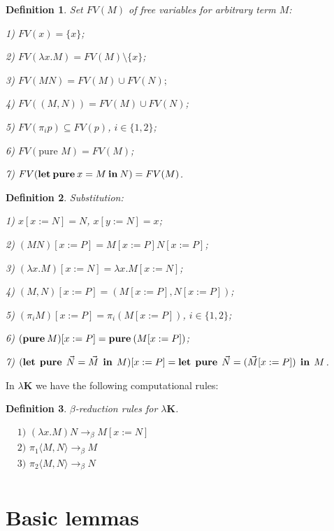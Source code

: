 \documentclass[a4paper]{article}
\newtheorem{defin}{Definition}
\begin{document}
  \begin{defin} Set $FV(M)$ of free variables for arbitrary term $M$:

  1) $FV(x) = \{ x \}$;

  2) $FV(\lambda x. M) = FV(M) \setminus \{ x\}$;

  3) $FV(M N) = FV(M) \cup FV(N);$

  4) $FV((M,N)) = FV(M) \cup FV(N)$;

  5) $FV(\pi_i p) \subseteq FV(p)$, $i \in \{ 1, 2\}$;

  6) $FV(\text{pure } M) = FV(M)$;

  7) $FV({\bf let \: pure} \: x = M \: {\bf in} \: N) = FV(M)$.
  \end{defin}

  \begin{defin} Substitution:

  1) $x [x := N] = N$, $x [y := N] = x$;

  2) $(M N) [x := P] = M[x := P] N [x := P]$;

  3) $(\lambda x. M) [x := N] = \lambda x. M [x := N]$;

  4) $(M, N)[x := P] = (M[x := P], N [x := P])$;

  5) $(\pi_i M) [x := P] = \pi_i (M[x := P])$, $i \in \{ 1, 2\}$;

  6) $({\bf pure \: } M) [x := P] = {\bf pure \: } (M [x := P])$;

  7) $({\bf let \:\: pure} \:\: \vec{N} = \vec{M} \:\: {\bf in} \:\: M) [x := P] = {\bf let \:\: pure} \:\: \vec{N} = (\vec{M} [x := P]) \:\: {\bf in} \:\: M$.
  \end{defin}

  In $\lambda \textbf{K}$ we have the following computational rules:

  \begin{defin} $\beta$-reduction rules for \emph{$\lambda \textbf{K}$}.

$\begin{array}{lll}
&\text{1) } (\lambda x. M) N \rightarrow_{\beta} M [x := N]& \\
&\text{2) } \pi_1 \langle M, N \rangle \rightarrow_{\beta} M& \\
&\text{3) } \pi_2 \langle M, N \rangle \rightarrow_{\beta} N& \\
\end{array}$

  \end{defin}



  \section{Basic lemmas}
\end{document}
